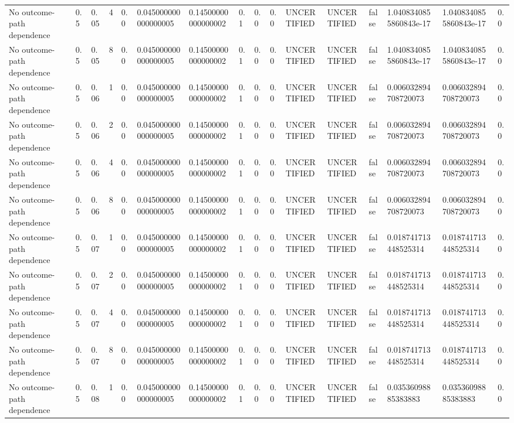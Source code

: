 \begin{tabular}{llllllllllllllll}
No outcome-path dependence & 0.5 & 0.05 & 4 & 0.0 & 0.045000000000000005 & 0.14500000000000002 & 0.1 & 0.0 & 0.0 & UNCERTIFIED & UNCERTIFIED & false & 1.0408340855860843e-17 & 1.0408340855860843e-17 & 0.0 \\
No outcome-path dependence & 0.5 & 0.05 & 8 & 0.0 & 0.045000000000000005 & 0.14500000000000002 & 0.1 & 0.0 & 0.0 & UNCERTIFIED & UNCERTIFIED & false & 1.0408340855860843e-17 & 1.0408340855860843e-17 & 0.0 \\
No outcome-path dependence & 0.5 & 0.06 & 1 & 0.0 & 0.045000000000000005 & 0.14500000000000002 & 0.1 & 0.0 & 0.0 & UNCERTIFIED & UNCERTIFIED & false & 0.006032894708720073 & 0.006032894708720073 & 0.0 \\
No outcome-path dependence & 0.5 & 0.06 & 2 & 0.0 & 0.045000000000000005 & 0.14500000000000002 & 0.1 & 0.0 & 0.0 & UNCERTIFIED & UNCERTIFIED & false & 0.006032894708720073 & 0.006032894708720073 & 0.0 \\
No outcome-path dependence & 0.5 & 0.06 & 4 & 0.0 & 0.045000000000000005 & 0.14500000000000002 & 0.1 & 0.0 & 0.0 & UNCERTIFIED & UNCERTIFIED & false & 0.006032894708720073 & 0.006032894708720073 & 0.0 \\
No outcome-path dependence & 0.5 & 0.06 & 8 & 0.0 & 0.045000000000000005 & 0.14500000000000002 & 0.1 & 0.0 & 0.0 & UNCERTIFIED & UNCERTIFIED & false & 0.006032894708720073 & 0.006032894708720073 & 0.0 \\
No outcome-path dependence & 0.5 & 0.07 & 1 & 0.0 & 0.045000000000000005 & 0.14500000000000002 & 0.1 & 0.0 & 0.0 & UNCERTIFIED & UNCERTIFIED & false & 0.018741713448525314 & 0.018741713448525314 & 0.0 \\
No outcome-path dependence & 0.5 & 0.07 & 2 & 0.0 & 0.045000000000000005 & 0.14500000000000002 & 0.1 & 0.0 & 0.0 & UNCERTIFIED & UNCERTIFIED & false & 0.018741713448525314 & 0.018741713448525314 & 0.0 \\
No outcome-path dependence & 0.5 & 0.07 & 4 & 0.0 & 0.045000000000000005 & 0.14500000000000002 & 0.1 & 0.0 & 0.0 & UNCERTIFIED & UNCERTIFIED & false & 0.018741713448525314 & 0.018741713448525314 & 0.0 \\
No outcome-path dependence & 0.5 & 0.07 & 8 & 0.0 & 0.045000000000000005 & 0.14500000000000002 & 0.1 & 0.0 & 0.0 & UNCERTIFIED & UNCERTIFIED & false & 0.018741713448525314 & 0.018741713448525314 & 0.0 \\
No outcome-path dependence & 0.5 & 0.08 & 1 & 0.0 & 0.045000000000000005 & 0.14500000000000002 & 0.1 & 0.0 & 0.0 & UNCERTIFIED & UNCERTIFIED & false & 0.03536098885383883 & 0.03536098885383883 & 0.0 \\

\end{tabular}
